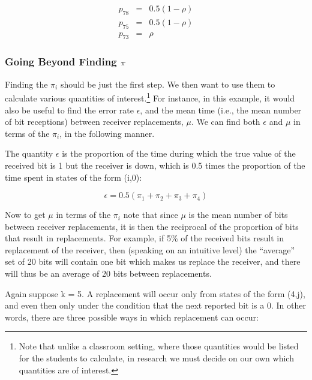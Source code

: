 \documentclass[11pt]{article}
\begin{document}
\begin{eqnarray}
p_{78} & = & 0.5(1-\rho )\\
p_{75} & = & 0.5(1-\rho )\\
p_{73} & = & \rho 
\end{eqnarray}

\subsubsection{Going Beyond Finding
\protect\protect\protect\protect\protect$\pi \protect \protect \protect
\protect \protect$}  

Finding the $\pi_{i}$ should be just the first step.  We then want to
use them to calculate various quantities of interest.\footnote{Note that
unlike a classroom setting, where those quantities would be listed for
the students to calculate, in research we must decide on our own which
quantities are of interest.} For instance, in this example, it would
also be useful to find the error rate $\epsilon$, and the mean time
(i.e., the mean number of bit receptions) between receiver replacements,
$\mu$. We can find both $\epsilon$ and $\mu$ in terms of the $\pi_{i}$,
in the following manner.

The quantity $\epsilon$ is the proportion of the time during which the
true value of the received bit is 1 but the receiver is down, which is
0.5 times the proportion of the time spent in states of the form (i,0):

\begin{equation}
\epsilon =0.5(\pi_{1}+\pi_{2}+\pi_{3}+\pi _{4})
\end{equation}

Now to get $\mu$ in terms of the $\pi_{i}$ note that since $\mu$ is the
mean number of bits between receiver replacements, it is then the
reciprocal of the proportion of bits that result in replacements. For
example, if 5\% of the received bits result in replacement of the
receiver, then (speaking on an intuitive level) the ``average'' set of
20 bits will contain one bit which makes us replace the receiver, and
there will thus be an average of 20 bits between replacements.

Again suppose k = 5. A replacement will occur only from states of the
form (4,j), and even then only under the condition that the next
reported bit is a 0. In other words, there are three possible ways in
which replacement can occur:
\end{document}

